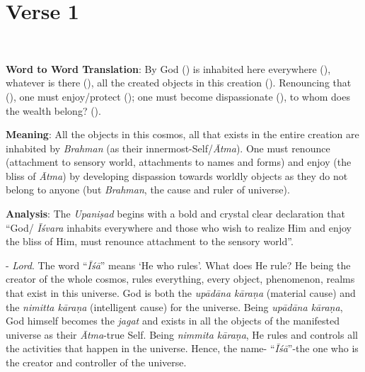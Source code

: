 \chapter{Verse 1}

\begin{moolashloka}
\\
\end{moolashloka}

\textbf{Word to Word Translation}: By God () is inhabited here everywhere (), whatever is there (), all the created objects in this creation (). Renouncing that (), one must enjoy/protect (); one must become dispassionate (), to whom does the wealth belong? ().
\vskip 1.1pt

\textbf{Meaning}: All the objects in this cosmos, all that exists in the entire creation are inhabited by \emph{Brahman} (as their innermost-Self/\emph{Ātma}). One must renounce (attachment to sensory world, attachments to names and forms) and enjoy (the bliss of \emph{Ātma}) by developing dispassion towards worldly objects as they do not belong to anyone (but \emph{Brahman}, the cause and ruler of universe).
\vskip 1.1pt

\textbf{Analysis}: The \emph{Upaniṣad} begins with a bold and crystal clear declaration that ``God/ \emph{Īśvara} inhabits everywhere and those who wish to realize Him and enjoy the bliss of Him, must renounce attachment to the sensory world''.

- \emph{Lord}. The word ``\emph{Īśā}'' means `He who rules'. What does He rule? He being the creator of the whole cosmos, rules everything, every object, phenomenon, realms that exist in this universe. God is both the \emph{upādāna kāraṇa} (material cause) and the \emph{nimitta kāraṇa} (intelligent cause) for the universe. Being \emph{upādāna kāraṇa}, God himself becomes the \emph{jagat} and exists in all the objects of the manifested universe as their \emph{Ātma}-true Self. Being \emph{nimmita kāraṇa}, He rules and controls all the activities that happen in the universe. Hence, the name- ``\emph{Īśā}''-the one who is the creator and controller of the universe.

